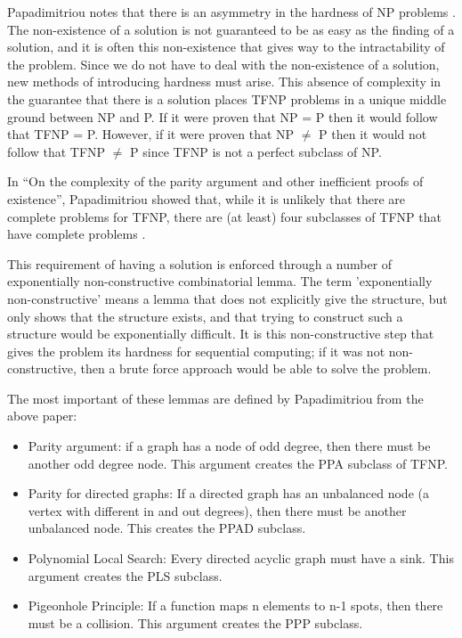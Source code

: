 \documentclass[10pt]{article}
\theoremstyle{definition}
\theoremstyle{remark}
\theoremstyle{definition}
\begin{document}
Papadimitriou notes that there is an asymmetry in the hardness of NP problems \cite{papadimitriou1994complexity}. The non-existence of a solution is not guaranteed to be as easy as the finding of a solution, and it is often this non-existence that gives way to the intractability of the problem. Since we do not have to deal with the non-existence of a solution, new methods of introducing hardness must arise. This absence of complexity in the guarantee that there is a solution places TFNP problems in a unique middle ground between NP and P. If it were proven that NP = P then it would follow that TFNP = P. However, if it were proven that NP $\neq$ P then it would not follow that TFNP $\neq$ P since TFNP is not a perfect subclass of NP. 

In “On the complexity of the parity argument and other inefficient proofs of existence”, Papadimitriou showed that, while it is unlikely that there are complete problems for TFNP, there are (at least) four subclasses of TFNP that have complete problems \cite{papadimitriou1994complexity}.

This requirement of having a solution is enforced through a number of exponentially non-constructive combinatorial lemma. The term 'exponentially non-constructive' means a lemma that does not explicitly give the structure, but only shows that the structure exists, and that trying to construct such a structure would be exponentially difficult. It is this non-constructive step that gives the problem its hardness for sequential computing; if it was not non-constructive, then a brute force approach would be able to solve the problem. 

The most important of these lemmas are defined by Papadimitriou from the above paper:

\begin{itemize}
    \item Parity argument: if a graph has a node of odd degree, then there must be another odd degree node. This argument creates the PPA subclass of TFNP.
    \item Parity for directed graphs: If a directed graph has an unbalanced node (a vertex with different in and out degrees), then there must be another unbalanced node. This creates the PPAD subclass.
    \item Polynomial Local Search: Every directed acyclic graph must have a sink. This argument creates the PLS subclass.
    \item Pigeonhole Principle: If a function maps n elements to n-1 spots, then there must be a collision. This argument creates the PPP subclass.
\end{itemize}
\end{document}
